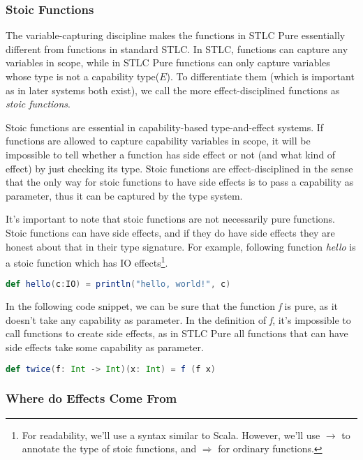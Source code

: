 \subsubsection{Stoic Functions}

The variable-capturing discipline makes the functions in STLC Pure
essentially different from functions in standard STLC. In STLC,
functions can capture any variables in scope, while in STLC Pure
functions can only capture variables whose type is not a capability
type($E$). To differentiate them (which is important as in later
systems both exist), we call the more effect-disciplined functions as
\emph{stoic functions}.

Stoic functions are essential in capability-based type-and-effect
systems. If functions are allowed to capture capability variables in
scope, it will be impossible to tell whether a function has side
effect or not (and what kind of effect) by just checking its
type. Stoic functions are effect-disciplined in the sense that the
only way for stoic functions to have side effects is to pass a
capability as parameter, thus it can be captured by the type system.

It's important to note that stoic functions are not necessarily pure
functions. Stoic functions can have side effects, and if they do have
side effects they are honest about that in their type signature. For
example, following function \emph{hello} is a stoic function which has
IO effects\footnote{For readability, we'll use a syntax similar to
  Scala. However, we'll use $\to$ to annotate the type of stoic
  functions, and $\Rightarrow$ for ordinary functions.}.

\begin{lstlisting}[language=Scala]
  def hello(c:IO) = println("hello, world!", c)
\end{lstlisting}

In the following code snippet, we can be sure that the function
\emph{f} is pure, as it doesn't take any capability as parameter. In
the definition of \emph{f}, it's impossible to call functions to
create side effects, as in STLC Pure all functions that can have side
effects take some capability as parameter.

\begin{lstlisting}[language=Scala]
  def twice(f: Int -> Int)(x: Int) = f (f x)
\end{lstlisting}

\subsubsection{Where do Effects Come From}

